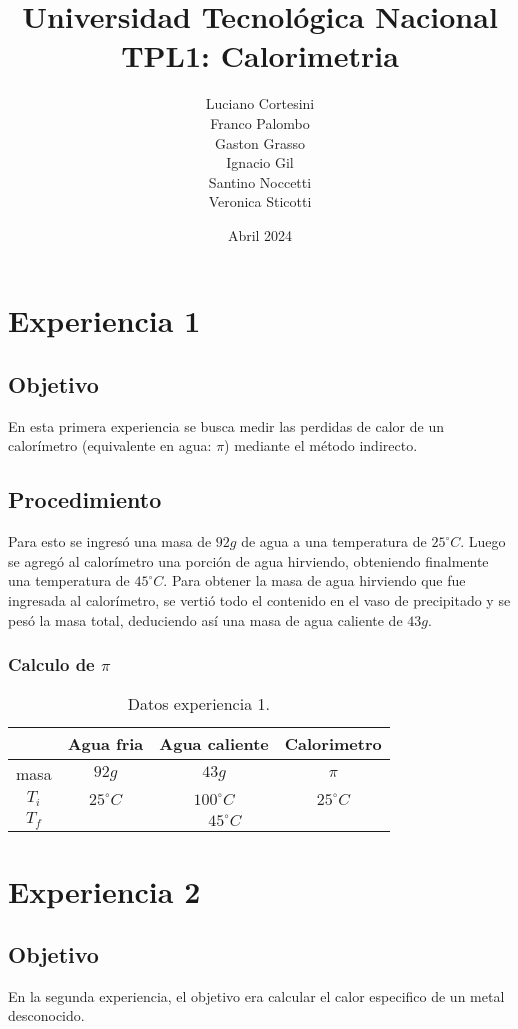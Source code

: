 \documentclass[12pt]{report}
\title{Universidad Tecnológica Nacional\\TPL1: Calorimetria}
\author{
Luciano Cortesini\\
Franco Palombo\\
Gaston Grasso\\
Ignacio Gil\\
Santino Noccetti\\
Veronica Sticotti
}
\date{Abril 2024}
\begin{document}
\maketitle

\chapter{Experiencia 1}
\section{Objetivo}
En esta primera experiencia se busca medir las perdidas de calor de un calorímetro (equivalente en agua: $\pi$) mediante el método indirecto. 

\section{Procedimiento}
Para esto se ingresó una masa de $92 g$ de agua a una temperatura de $25^\circ C$.
Luego se agregó al calorímetro una porción de agua hirviendo, obteniendo finalmente una temperatura de  $45^\circ C$. 
Para obtener la masa de agua hirviendo que fue ingresada al calorímetro, se vertió todo el contenido en el vaso de precipitado y se pesó la masa total, deduciendo así una masa de agua caliente de $43g$.
\subsection{Calculo de $\pi$}
\begin{table}[htbp]
    \centering
    \begin{tabular}{|c|c|c|c|}
    \hline
    & Agua fria & Agua caliente & Calorimetro\\
    \hline
    masa & $92g$ & $43g$ & $\pi$ \\
    \hline
   $T_i$ & $25^\circ C$ & $100^\circ C$ & $25^\circ C$\\
    \hline
     $T_f$ & \multicolumn{3}{|c|}{$45^\circ C$}\\
    \hline
    \end{tabular}
    \caption{Datos experiencia 1.}
    \label{tab:datos experiencia 1}
\end{table}


\chapter{Experiencia 2}
\section{Objetivo}
En la segunda experiencia, el objetivo era calcular el calor especifico de un metal desconocido.
\end{document}
